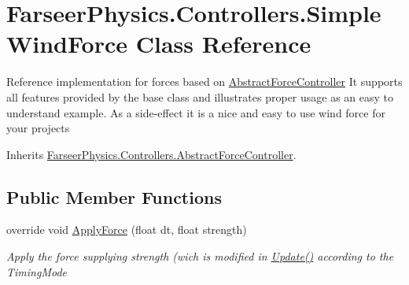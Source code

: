 \hypertarget{class_farseer_physics_1_1_controllers_1_1_simple_wind_force}{\section{Farseer\+Physics.\+Controllers.\+Simple\+Wind\+Force Class Reference}
\label{class_farseer_physics_1_1_controllers_1_1_simple_wind_force}
}


Reference implementation for forces based on \hyperlink{class_farseer_physics_1_1_controllers_1_1_abstract_force_controller}{Abstract\+Force\+Controller} It supports all features provided by the base class and illustrates proper usage as an easy to understand example. As a side-\/effect it is a nice and easy to use wind force for your projects  




Inherits \hyperlink{class_farseer_physics_1_1_controllers_1_1_abstract_force_controller}{Farseer\+Physics.\+Controllers.\+Abstract\+Force\+Controller}.

\subsection*{Public Member Functions}
\begin{DoxyCompactItemize}
\item 
override void \hyperlink{class_farseer_physics_1_1_controllers_1_1_simple_wind_force_aaeed799d0256faf1d5272dbed5610f22}{Apply\+Force} (float dt, float strength)
\begin{DoxyCompactList}\small\item\em Apply the force supplying strength (wich is modified in \hyperlink{class_farseer_physics_1_1_controllers_1_1_abstract_force_controller_a63753663663088aa7f1a04f785f25bf7}{Update()} according to the Timing\+Mode \end{DoxyCompactList}\end{DoxyCompactItemize}

